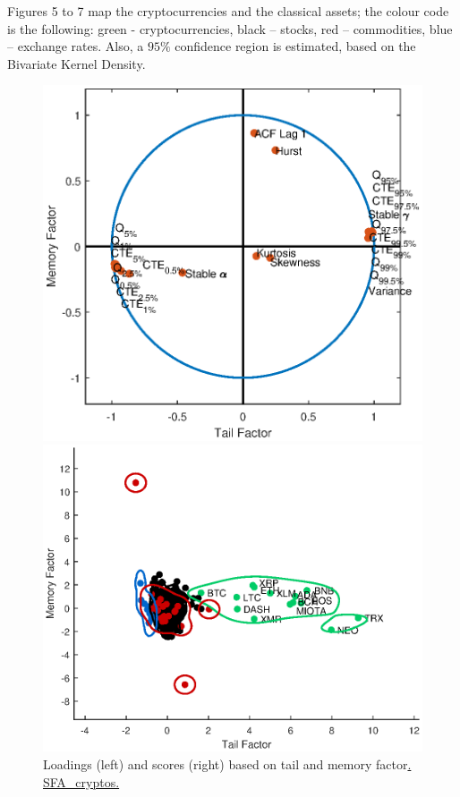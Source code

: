 Figures 5 to 7 map the cryptocurrencies and the classical assets; the colour code is the following: green - cryptocurrencies, black – stocks, red – commodities, blue – exchange rates. Also, a $95\%$ confidence region is estimated, based on the Bivariate Kernel Density. 
\begin{figure}[H]
	\begin{minipage}[b]{0.55\textwidth}
		\centering
		\includegraphics[width=1\textwidth]{Fig/figure_6a}
		
		
	\end{minipage}
	\begin{minipage}[b]{0.55\textwidth}
		\centering
		\includegraphics[width=1\textwidth]{Fig/figure_6b}
		
	\end{minipage}
	\caption {Loadings (left) and scores (right) based on tail and memory factor\href{https://github.com/QuantLet/Genus_proximum_cryptos/tree/master/SFA_Cryptos}{. SFA\_cryptos.}}
	\label{fig:figure_6}
\end{figure}

